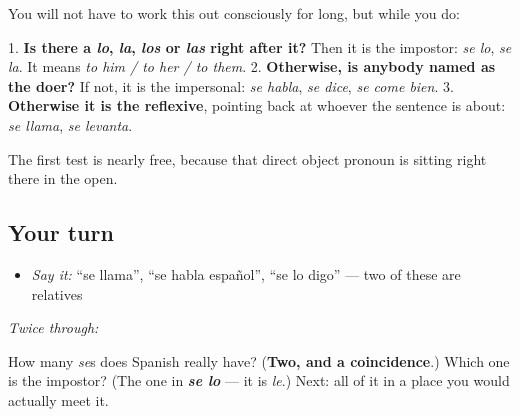 \begin{grammarlens}[title={Grammar Lens: how to tell them apart in the wild}]
You will not have to work this out consciously for long, but while you do:

1. \textbf{Is there a \emph{lo}, \emph{la}, \emph{los} or \emph{las} right after it?} Then it is the impostor: \emph{se lo}, \emph{se la}. It means \emph{to him / to her / to them}. 2. \textbf{Otherwise, is anybody named as the doer?} If not, it is the impersonal: \emph{se habla}, \emph{se dice}, \emph{se come bien}. 3. \textbf{Otherwise it is the reflexive}, pointing back at whoever the sentence is about: \emph{se llama}, \emph{se levanta}.

The first test is nearly free, because that direct object pronoun is sitting right there in the open.
\end{grammarlens}

\subsection*{Your turn}
\begin{itemize}
\raggedright
  \item \emph{Say it:} \textquotedblleft{}se llama\textquotedblright{}, \textquotedblleft{}se habla español\textquotedblright{}, \textquotedblleft{}se lo digo\textquotedblright{} — two of these are relatives
\end{itemize}

\emph{Twice through:}

\begin{tcolorbox}[breakable,colback=teal!4,colframe=teal!35!black,title={Before you move on}]
How many \emph{se}s does Spanish really have? (\textbf{Two, and a coincidence}.) Which one is the impostor? (The one in \emph{\textbf{se lo}} — it is \emph{le}.) Next: all of it in a place you would actually meet it.
\end{tcolorbox}

